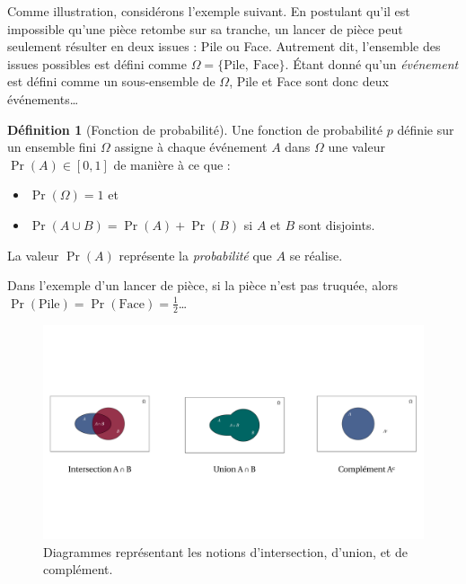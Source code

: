 \documentclass[
  a4paper,11pt,twoside,onecolumn,openright,final,oldfontcommands]{memoir}
\providecommand{\tightlist}{%
  \setlength{\itemsep}{0pt}\setlength{\parskip}{0pt}}
\theoremstyle{definition}
\newtheorem{definition}{Définition}[chapter]
\theoremstyle{definition}
\theoremstyle{definition}
\theoremstyle{definition}
\theoremstyle{remark}
\begin{document}
Comme illustration, considérons l'exemple suivant. En postulant qu'il est impossible qu'une pièce retombe sur sa tranche, un lancer de pièce peut seulement résulter en deux issues : Pile ou Face. Autrement dit, l'ensemble des issues possibles est défini comme \(\Omega = \{\text{Pile}, \ \text{Face}\}\). Étant donné qu'un \emph{événement} est défini comme un sous-ensemble de \(\Omega\), Pile et Face sont donc deux événements\ldots{}

\begin{definition}[Fonction de probabilité]
\protect\hypertarget{def:prob-function}{}\label{def:prob-function}Une fonction de probabilité \(p\) définie sur un ensemble fini \(\Omega\) assigne à chaque événement \(A\) dans \(\Omega\) une valeur \(\Pr(A) \in [0, 1]\) de manière à ce que :

\begin{itemize}
\tightlist
\item
  \(\Pr(\Omega) = 1\) et
\item
  \(\Pr(A \cup B) = \Pr(A) + \Pr(B)\) si \(A\) et \(B\) sont disjoints.
\end{itemize}

La valeur \(\Pr(A)\) représente la \emph{probabilité} que \(A\) se réalise.
\end{definition}

Dans l'exemple d'un lancer de pièce, si la pièce n'est pas truquée, alors \(\Pr(\text{Pile}) = \Pr(\text{Face}) = \frac{1}{2}\)\ldots{}

\begin{figure}[!htb]

{\centering \includegraphics[width=1\linewidth]{figures/venn} 

}

\caption{Diagrammes représentant les notions d'intersection, d'union, et de complément.}\label{fig:venn}
\end{figure}
\end{document}
